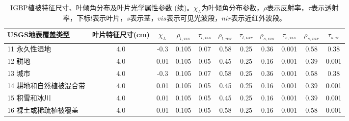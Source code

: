     \begin{sidewaystable}[]
        \centering
        \caption{IGBP植被特征尺寸、叶倾角分布及叶片光学属性参数 (续)。$\chi_L$为叶倾角分布参数，$\rho$表示反射率，$\tau$表示透射率，下标$l$表示叶片，$s$表示茎，$vis$表示可见光波段，$nir$表示近红外波段。}
        \label{tab:IGBP植被特征尺寸叶倾角分布及叶片光学属性参数2}
            \begin{tabular}{@{}lcccccccccc@{}}
            \toprule
            USGS地表覆盖类型     & 叶片特征尺寸(cm) & $\chi_L$ &$\rho_{l, vis}$ & $\tau_{l, v i s}$  &$\rho_{l,  nir}$ &$\tau_{l,  nir}$ & $\rho_{s, v i s}$ &$\tau_{s, v i s}$ &$\rho_{s, nir}$ &$\tau_{s,ir}$\\ \midrule
            11 永久性湿地      & 4.0         & -0.3         & 0.105          & 0.07          & 0.58          & 0.25          & 0.36          & 0.001          & 0.58           & 0.38 \\
            12 耕地         & 4.0          & 0.01          & 0.105          & 0.05          & 0.45          & 0.25          & 0.16          & 0.001          & 0.39          & 0.001         \\
            13 城市         & 4.0          & -0.3          & 0.105          & 0.07          & 0.58          & 0.25          & 0.36          & 0.001          & 0.58          & 0.38          \\
            14 耕地和自然植被混合带 & 4.0          & 0.01          & 0.105          & 0.05          & 0.45          & 0.25          & 0.16          & 0.001          & 0.39          & 0.001         \\
            15 积雪和冰川      & 4.0          & 0.01          & 0.105          & 0.05          & 0.45          & 0.25          & 0.16          & 0.001          & 0.39          & 0.001         \\
            16 裸土或稀疏植被覆盖  & 4.0          & 0.01          & 0.105          & 0.05          & 0.58          & 0.25          & 0.16          & 0.001          & 0.58          & 0.001         \\\bottomrule
        \end{tabular}
    \end{sidewaystable}
    

